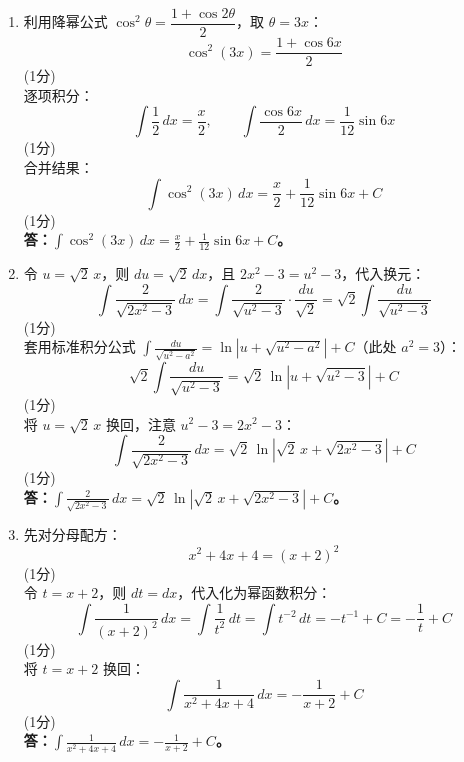\documentclass[12pt,a4paper]{exam-zh}
\begin{document}
\begin{solution}
    \begin{enumerate}[label=(\alph*)]
        \item 利用降幂公式 $\cos^2\theta = \dfrac{1 + \cos 2\theta}{2}$，取 $\theta = 3x$： \\
        $$\cos^2(3x) = \frac{1 + \cos 6x}{2}$$ \hfill (1分) \\
        逐项积分： \\
        $$\int \frac{1}{2} \, dx = \frac{x}{2}, \qquad \int \frac{\cos 6x}{2} \, dx = \frac{1}{12}\sin 6x$$ \hfill (1分) \\
        合并结果： \\
        $$\int \cos^2(3x) \, dx = \frac{x}{2} + \frac{1}{12}\sin 6x + C$$ \hfill (1分) \\
        \textbf{答：$\displaystyle \int \cos^2(3x)\,dx = \frac{x}{2} + \frac{1}{12}\sin 6x + C$。}

        \item 令 $u = \sqrt{2}\,x$，则 $du = \sqrt{2}\,dx$，且 $2x^2 - 3 = u^2 - 3$，代入换元： \\
        $$\int \frac{2}{\sqrt{2x^2-3}}\,dx = \int \frac{2}{\sqrt{u^2-3}} \cdot \frac{du}{\sqrt{2}} = \sqrt{2} \int \frac{du}{\sqrt{u^2-3}}$$ \hfill (1分) \\
        套用标准积分公式 $\displaystyle \int \frac{du}{\sqrt{u^2-a^2}} = \ln\left|u + \sqrt{u^2-a^2}\right| + C$（此处 $a^2 = 3$）： \\
        $$\sqrt{2}\int \frac{du}{\sqrt{u^2-3}} = \sqrt{2}\,\ln\left|u + \sqrt{u^2-3}\right| + C$$ \hfill (1分) \\
        将 $u = \sqrt{2}\,x$ 换回，注意 $u^2 - 3 = 2x^2-3$： \\
        $$\int \frac{2}{\sqrt{2x^2-3}}\,dx = \sqrt{2}\,\ln\left|\sqrt{2}\,x + \sqrt{2x^2-3}\right| + C$$ \hfill (1分) \\
        \textbf{答：$\displaystyle \int \frac{2}{\sqrt{2x^2-3}}\,dx = \sqrt{2}\,\ln\left|\sqrt{2}\,x + \sqrt{2x^2-3}\right| + C$。}

        \item 先对分母配方： \\
        $$x^2 + 4x + 4 = (x+2)^2$$ \hfill (1分) \\
        令 $t = x+2$，则 $dt = dx$，代入化为幂函数积分： \\
        $$\int \frac{1}{(x+2)^2}\,dx = \int \frac{1}{t^2}\,dt = \int t^{-2}\,dt = -t^{-1} + C = -\frac{1}{t} + C$$ \hfill (1分) \\
        将 $t = x+2$ 换回： \\
        $$\int \frac{1}{x^2+4x+4}\,dx = -\frac{1}{x+2} + C$$ \hfill (1分) \\
        \textbf{答：$\displaystyle \int \frac{1}{x^2+4x+4}\,dx = -\frac{1}{x+2} + C$。}
    \end{enumerate}
\end{solution}
\end{document}
